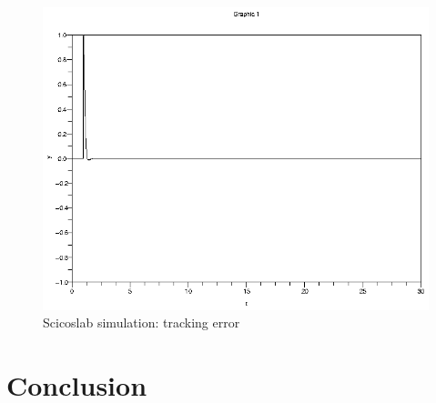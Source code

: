 \documentclass[a4paper,12pt,oneside]{article}
\begin{document}
\begin{figure}
	\centering
	\includegraphics[width=\columnwidth]{../controler/tracking_err.eps}
	\caption{Scicoslab simulation: tracking error}
	\label{fig:simulation_tracking_err}
\end{figure}

\section{Conclusion}
\end{document}
